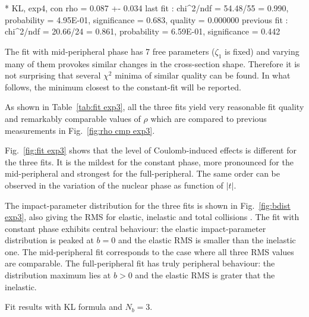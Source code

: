 * KL, exp4, con
rho    =   0.087 +-  0.034
last fit     : chi^2/ndf = 54.48/55 = 0.990, probability = 4.95E-01, significance = 0.683, quality = 0.000000
previous fit : chi^2/ndf = 20.66/24 = 0.861, probability = 6.59E-01, significance = 0.442
\fi


The fit with mid-peripheral phase has 7 free parameters ($\zeta_1$ is fixed) and varying many of them provokes similar changes in the cross-section shape. Therefore it is not surprising that several $\chi^2$ minima of similar quality can be found. In what follows, the minimum closest to the constant-fit will be reported.

As shown in Table~\ref{tab:fit exp3}, all the three fits yield very reasonable fit quality and remarkably comparable values of $\rho$ which are compared to previous measurements in Fig.~\ref{fig:rho cmp exp3}.

Fig.~\ref{fig:fit exp3} shows that the level of Coulomb-induced effects is different for the three fits. It is the mildest for the constant phase, more pronounced for the mid-peripheral and strongest for the full-peripheral. The same order can be observed in the variation of the nuclear phase as function of $|t|$.

The impact-parameter distribution  for the three fits is shown in Fig.~\ref{fig:bdist exp3}, also giving the RMS for elastic, inelastic and total collisions . The fit with constant phase exhibits central behaviour: the elastic impact-parameter distribution is peaked at $b=0$ and the elastic RMS is smaller than the inelastic one. The mid-peripheral fit corresponds to the case where all three RMS values are comparable. The full-peripheral fit has truly peripheral behaviour: the distribution maximum lies at $b > 0$ and the elastic RMS is grater that the inelastic.


\begin{table}
\caption{Fit results with KL formula and $N_b=3$. }
\vskip-3mm
\label{tab:fit exp3}
\begin{center}
\setlength\tabcolsep{5mm}
\small

\end{center}
\end{table}

